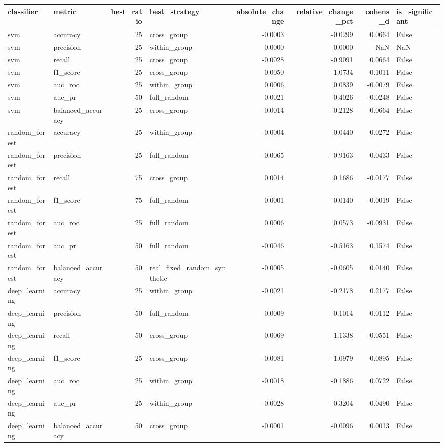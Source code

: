 \begin{tabular}{llrlrrrl}
\toprule
classifier & metric & best_ratio & best_strategy & absolute_change & relative_change_pct & cohens_d & is_significant \\
\midrule
svm & accuracy & 25 & cross_group & -0.0003 & -0.0299 & 0.0664 & False \\
svm & precision & 25 & within_group & 0.0000 & 0.0000 & NaN & NaN \\
svm & recall & 25 & cross_group & -0.0028 & -0.9091 & 0.0664 & False \\
svm & f1_score & 25 & cross_group & -0.0050 & -1.0734 & 0.1011 & False \\
svm & auc_roc & 25 & within_group & 0.0006 & 0.0839 & -0.0079 & False \\
svm & auc_pr & 50 & full_random & 0.0021 & 0.4026 & -0.0248 & False \\
svm & balanced_accuracy & 25 & cross_group & -0.0014 & -0.2128 & 0.0664 & False \\
random_forest & accuracy & 25 & within_group & -0.0004 & -0.0440 & 0.0272 & False \\
random_forest & precision & 25 & full_random & -0.0065 & -0.9163 & 0.0433 & False \\
random_forest & recall & 75 & cross_group & 0.0014 & 0.1686 & -0.0177 & False \\
random_forest & f1_score & 75 & full_random & 0.0001 & 0.0140 & -0.0019 & False \\
random_forest & auc_roc & 25 & full_random & 0.0006 & 0.0573 & -0.0931 & False \\
random_forest & auc_pr & 50 & full_random & -0.0046 & -0.5163 & 0.1574 & False \\
random_forest & balanced_accuracy & 50 & real_fixed_random_synthetic & -0.0005 & -0.0605 & 0.0140 & False \\
deep_learning & accuracy & 25 & within_group & -0.0021 & -0.2178 & 0.2177 & False \\
deep_learning & precision & 50 & full_random & -0.0009 & -0.1014 & 0.0112 & False \\
deep_learning & recall & 50 & cross_group & 0.0069 & 1.1338 & -0.0551 & False \\
deep_learning & f1_score & 25 & cross_group & -0.0081 & -1.0979 & 0.0895 & False \\
deep_learning & auc_roc & 25 & within_group & -0.0018 & -0.1886 & 0.0722 & False \\
deep_learning & auc_pr & 25 & within_group & -0.0028 & -0.3204 & 0.0490 & False \\
deep_learning & balanced_accuracy & 50 & cross_group & -0.0001 & -0.0096 & 0.0013 & False \\
\bottomrule
\end{tabular}
